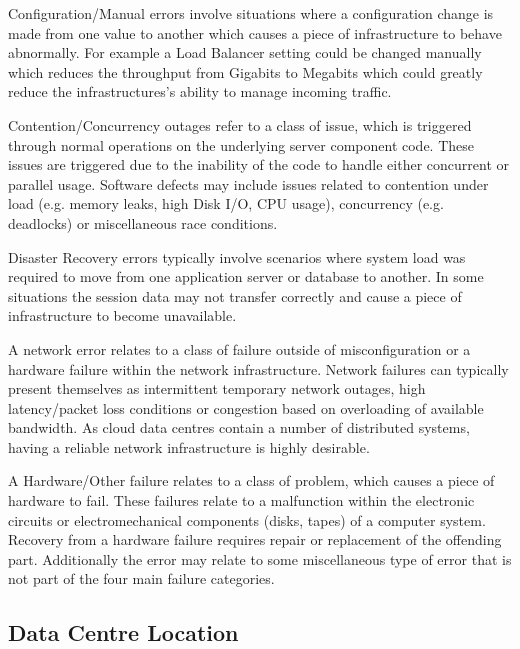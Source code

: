 \documentclass[conference]{IEEEtran}
\begin{document}
Configuration/Manual errors involve situations where a configuration change is made from one value to another which causes a piece of infrastructure to behave abnormally. For example a Load Balancer setting could be changed manually which reduces the throughput from Gigabits to Megabits which could greatly reduce the infrastructures's ability to manage incoming traffic.\par

Contention/Concurrency outages refer to a class of issue, which is triggered through normal operations on the underlying server component code. These issues are triggered due to the inability of the code to handle either concurrent or parallel usage. Software defects may include issues related to contention under load (e.g. memory leaks, high Disk I/O, CPU usage), concurrency (e.g. deadlocks) or miscellaneous race conditions. \par

Disaster Recovery errors typically involve scenarios where system load was required to move from one application server or database to another. In some situations the session data may not transfer correctly and cause a piece of infrastructure to become unavailable. \par

A network error relates to a class of failure outside of misconfiguration or a hardware failure within the network infrastructure. Network failures can typically present themselves as intermittent temporary network outages, high latency/packet loss conditions or congestion based on overloading of available bandwidth. As cloud data centres contain a number of distributed systems, having a reliable network infrastructure is highly desirable. \par

A Hardware/Other failure relates to a class of problem, which causes a piece of hardware to fail. These failures relate to a malfunction within the electronic circuits or electromechanical components (disks, tapes) of a computer system. Recovery from a hardware failure requires repair or replacement of the offending part. Additionally the error may relate to some miscellaneous type of error that is not part of the four main failure categories. \par

\subsection{Data Centre Location}
\end{document}
